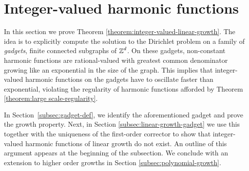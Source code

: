\documentclass[12pt]{amsart}
\numberwithin{equation}{section}
\begin{document}
	
	\section{Integer-valued harmonic functions} \label{sec:integer-harmonic}
	\newcommand{\sgadget}{\hyperref[eq:st-gadget]{s}}
	\newcommand{\tgadget}{\hyperref[eq:st-gadget]{t}}
	\newcommand{\agadget}{\hyperref[eq:st-gadget]{a}}
	\newcommand{\bgadget}{\hyperref[eq:st-gadget]{b}}
	\newcommand{\Tn}[1]{\hyperref[eq:gadget-def]{T_{#1}}}
	\newcommand{\Rn}[1]{\hyperref[eq:effective-resistance]{R_{#1}}}
	
	
	
	In this section we prove Theorem \ref{theorem:integer-valued-linear-growth}. The idea is to explicitly compute the solution to the Dirichlet problem 
	on a family of {\it gadgets}, finite connected subgraphs of $\operatorname{\mathbb{Z}}^d$. On these gadgets, non-constant harmonic functions are rational-valued
	with greatest common denominator growing like an exponential in the size of the graph. This implies that integer-valued harmonic functions on the gadgets have to oscillate faster than exponential, violating the regularity of harmonic functions afforded by Theorem \ref{theorem:large scale-regularity}. 
	
	In Section~\ref{subsec:gadget-def}, we identify the aforementioned gadget and prove the growth property. 
	Next, in Section \ref{subsec:linear-growth-gadget} we use this together with the uniqueness of the first-order corrector to show that integer-valued harmonic functions of linear growth do not exist. An outline of this argument appears at the beginning of the subsection. We conclude with an extension to higher order growths in Section \ref{subsec:polynomial-growth}. 
	
\end{document}
